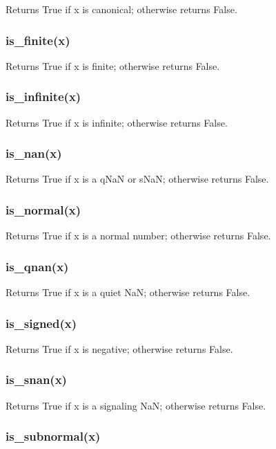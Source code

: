 Returns True if x is canonical; otherwise returns False.

\subsubsection{is\_finite(x)}

Returns True if x is finite; otherwise returns False.

\subsubsection{is\_infinite(x)}

Returns True if x is infinite; otherwise returns False.

\subsubsection{is\_nan(x)}

Returns True if x is a qNaN or sNaN; otherwise returns False.

\subsubsection{is\_normal(x)}

Returns True if x is a normal number; otherwise returns False.

\subsubsection{is\_qnan(x)}

Returns True if x is a quiet NaN; otherwise returns False.

\subsubsection{is\_signed(x)}

Returns True if x is negative; otherwise returns False.

\subsubsection{is\_snan(x)}

Returns True if x is a signaling NaN; otherwise returns False.

\subsubsection{is\_subnormal(x)}

